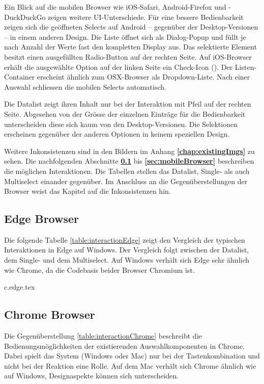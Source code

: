 Ein Blick auf die mobilen Browser wie iOS-Safari, Android-Firefox und -DuckDuckGo zeigen weitere UI-Unterschiede. 
Für eine bessere Bedienbarkeit zeigen sich die geöffneten Selects auf Android – gegenüber der Desktop-Versionen – in einem anderen Design. 
Die Liste öffnet sich als Dialog-Popup und füllt je nach Anzahl der Werte fast den kompletten Display aus. 
Das selektierte Element besitzt einen ausgefüllten Radio-Button auf der rechten Seite. 
Auf iOS-Browser erhält die ausgewählte Option auf der linken Seite ein Check-Icon (\cmark). 
Der Listen-Container erscheint ähnlich zum OSX-Browser als Dropdown-Liste. 
Nach einer Auswahl schliessen die mobilen Selects automatisch. 

Die Datalist zeigt ihren Inhalt nur bei der Interaktion mit Pfeil auf der rechten Seite. 
Abgesehen von der Grösse der einzelnen Einträge für die Bedienbarkeit unterscheiden diese sich kaum von den Desktop-Versionen. 
Die Selektionen erscheinen gegenüber der anderen Optionen in keinem speziellen Design. 

Weitere Inkonsistenzen sind in den Bildern im Anhang \textbf{\ref{chap:existingImgs}} zu sehen. 
Die nachfolgenden Abschnitte \textbf{\ref{sec:edgeBrowser}} bis \textbf{\ref{sec:mobileBrowser}} beschreiben die möglichen Interaktionen. 
Die Tabellen stellen das Datalist, Single- als auch Multiselect einander gegenüber. 
Im Anschluss an die Gegenüberstellungen der Browser weist das Kapitel \textbf{} auf die Inkonsistenzen hin. 


\clearpage
\subsection{Edge Browser}
\label{sec:edgeBrowser}

Die folgende Tabelle \ref{table:interactionEdge} zeigt den Vergleich der typischen Interaktionen in Edge auf Windows. 
Der Vergleich folgt zwischen der Datalist, dem Single- und dem Multiselect. 
Auf Windows verhält sich Edge sehr ähnlich wie Chrome, da die Codebasis beider Browser Chromium ist. 

{c.edge.tex}


\clearpage
\subsection{Chrome Browser}
\label{sec:chromeBrowser}

Die Gegenüberstellung \ref{table:interactionChrome} beschreibt die Bedienungsmöglichkeiten der existierenden Auswahlkomponenten in Chrome. 
Dabei spielt das System (Windows oder Mac) nur bei der Tastenkombination und nicht bei der Reaktion eine Rolle. 
Auf dem Mac verhält sich Chrome ähnlich wie auf Windows, Designaspekte können sich unterscheiden. 

